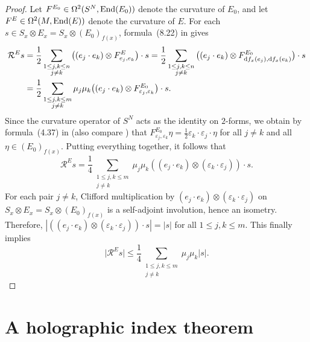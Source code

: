 \documentclass[11pt]{article}
\numberwithin{equation}{section}
\numberwithin{equation}{section}
\begin{document}
\begin{proof}
Let $F^{E_0} \in \Omega^2(S^N, {\rm End}(E_0))$ denote the curvature of $E_0$, and let $F^E \in \Omega^2(M, {\rm End}(E))$ denote the curvature of $E$. For each $s \in S_x \otimes E_x = S_x \otimes (E_0)_{f(x)}$, formula~(8.22) in \cite[Chapter II]{Lawson-Michelsohn} gives
\begin{align*}
\mathcal{R}^E s
&= \frac{1}{2} \sum_{\substack{1 \leq j,k \leq n\\ j \neq k}} \big((e_j \cdot e_k) \otimes F^E_{e_j, e_k}\big) \cdot s = \frac{1}{2} \sum_{\substack{1 \leq j,k \leq n\\ j \neq k}} \big((e_j \cdot e_k) \otimes F^{E_0}_{{\rm d}f_x(e_j), {\rm d}f_x(e_k)}\big) \cdot s \\
&= \frac{1}{2} \sum_{\substack{1 \leq j,k \leq m\\ j \neq k}} \mu_j \mu_k \big((e_j \cdot e_k) \otimes F^{E_0}_{\varepsilon_j,\varepsilon_k}\big) \cdot s.
\end{align*}
Since the curvature operator of $S^N$ acts as the identity on $2$-forms, we obtain by formula~(4.37) in \cite[Chapter II]{Lawson-Michelsohn} (also compare \cite[Lemma 4.3]{Llarull}) that $F^{E_0}_{\varepsilon_j,\varepsilon_k} \eta = \frac{1}{2} \varepsilon_k \cdot \varepsilon_j \cdot \eta$ for all $j \neq k$ and all $\eta \in (E_0)_{f(x)}$.
Putting everything together, it follows that
\[
 \mathcal{R}^E s = \frac{1}{4} \sum_{\substack{1 \leq j,k \leq m\\ j \neq k}} \mu_j \mu_k ((e_j \cdot e_k) \otimes (\varepsilon_k \cdot \varepsilon_j)) \cdot s.
\]
For each pair $j \neq k$, Clifford multiplication by $(e_j \cdot e_k) \otimes (\varepsilon_k \cdot \varepsilon_j)$ on $S_x \otimes E_x = S_x \otimes (E_0)_{f(x)}$ is a self-adjoint involution, hence an isometry.
Therefore, $
 |((e_j \cdot e_k) \otimes (\varepsilon_k \cdot \varepsilon_j)) \cdot s| = |s|$ for all $1 \leq j,k \leq m$.
This finally implies
\begin{equation*}
\big|\mathcal{R}^E s\big| \leq \frac{1}{4} \sum_{\substack{1 \leq j,k \leq m\\ j \neq k}} \mu_j \mu_k |s|.\tag*{\qed}
\end{equation*} \renewcommand{\qed}{}
\end{proof}

\section{A holographic index theorem}

\label{holographic}
\end{document}
